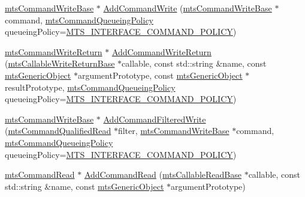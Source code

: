 \begin{DoxyCompactItemize}
\item 
\hyperlink{classmts_command_write_base}{mts\+Command\+Write\+Base} $\ast$ \hyperlink{classmts_interface_provided_acadf7fa0aa311831ccb7b2c852a057d3}{Add\+Command\+Write} (\hyperlink{classmts_command_write_base}{mts\+Command\+Write\+Base} $\ast$command, \hyperlink{mts_forward_declarations_8h_aa2ac24035e136fa1689dcc2854c63fc7}{mts\+Command\+Queueing\+Policy} queueing\+Policy=\hyperlink{mts_forward_declarations_8h_aa2ac24035e136fa1689dcc2854c63fc7a4f444b4120a5e2efd084e2e5a214f5c8}{M\+T\+S\+\_\+\+I\+N\+T\+E\+R\+F\+A\+C\+E\+\_\+\+C\+O\+M\+M\+A\+N\+D\+\_\+\+P\+O\+L\+I\+C\+Y})
\item 
\hyperlink{classmts_command_write_return}{mts\+Command\+Write\+Return} $\ast$ \hyperlink{classmts_interface_provided_ad6f8a29f43faea5dd7f5cb128f13d650}{Add\+Command\+Write\+Return} (\hyperlink{classmts_callable_write_return_base}{mts\+Callable\+Write\+Return\+Base} $\ast$callable, const std\+::string \&name, const \hyperlink{classmts_generic_object}{mts\+Generic\+Object} $\ast$argument\+Prototype, const \hyperlink{classmts_generic_object}{mts\+Generic\+Object} $\ast$result\+Prototype, \hyperlink{mts_forward_declarations_8h_aa2ac24035e136fa1689dcc2854c63fc7}{mts\+Command\+Queueing\+Policy} queueing\+Policy=\hyperlink{mts_forward_declarations_8h_aa2ac24035e136fa1689dcc2854c63fc7a4f444b4120a5e2efd084e2e5a214f5c8}{M\+T\+S\+\_\+\+I\+N\+T\+E\+R\+F\+A\+C\+E\+\_\+\+C\+O\+M\+M\+A\+N\+D\+\_\+\+P\+O\+L\+I\+C\+Y})
\item 
\hyperlink{classmts_command_write_base}{mts\+Command\+Write\+Base} $\ast$ \hyperlink{classmts_interface_provided_ad4c7b4c4523622b7b8e1d47bffabfc90}{Add\+Command\+Filtered\+Write} (\hyperlink{classmts_command_qualified_read}{mts\+Command\+Qualified\+Read} $\ast$filter, \hyperlink{classmts_command_write_base}{mts\+Command\+Write\+Base} $\ast$command, \hyperlink{mts_forward_declarations_8h_aa2ac24035e136fa1689dcc2854c63fc7}{mts\+Command\+Queueing\+Policy} queueing\+Policy=\hyperlink{mts_forward_declarations_8h_aa2ac24035e136fa1689dcc2854c63fc7a4f444b4120a5e2efd084e2e5a214f5c8}{M\+T\+S\+\_\+\+I\+N\+T\+E\+R\+F\+A\+C\+E\+\_\+\+C\+O\+M\+M\+A\+N\+D\+\_\+\+P\+O\+L\+I\+C\+Y})
\item 
\hyperlink{classmts_command_read}{mts\+Command\+Read} $\ast$ \hyperlink{classmts_interface_provided_a440a0f5457e6d9128d016eca75f19610}{Add\+Command\+Read} (\hyperlink{classmts_callable_read_base}{mts\+Callable\+Read\+Base} $\ast$callable, const std\+::string \&name, const \hyperlink{classmts_generic_object}{mts\+Generic\+Object} $\ast$argument\+Prototype)

\end{DoxyCompactItemize}
